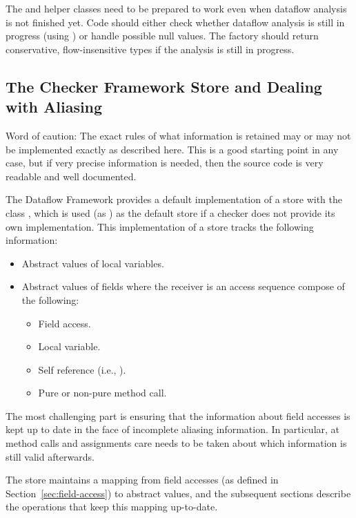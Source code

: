 The  and helper classes need to be prepared to work
even when dataflow analysis is not finished yet. Code should either check
whether dataflow analysis is still in progress (using
) or handle possible null values. The factory should
return conservative, flow-insensitive types if the analysis is still in
progress.


\subsection{The Checker Framework Store and Dealing with Aliasing}

\begin{workinprogress}
    Word of caution: The exact rules of what information is
        retained may or may not be implemented exactly as described
        here.  This is a good starting point in any case, but if very
        precise information is needed, then the source code is very
        readable and well documented.
\end{workinprogress}

The Dataflow Framework provides a default implementation of a store
with the class , which is used (as
) as the default store if a checker does not provide its
own implementation.  This implementation of a store tracks the
following information:

\begin{itemize}
    \item Abstract values of local variables.
    \item Abstract values of fields where the receiver is an
          access sequence compose of the following:
    \begin{itemize}
    \item Field access.
    \item Local variable.
    \item Self reference (i.e., ).
    \item Pure or non-pure method call.
    \end{itemize}
\end{itemize}

The most challenging part is ensuring that the information about field
accesses is kept up to date in the face of incomplete aliasing
information.  In particular, at method calls and assignments care
needs to be taken about which information is still valid afterwards.

The store maintains a mapping from field accesses (as defined in
Section~\ref{sec:field-access}) to abstract values, and the subsequent
sections describe the operations that keep this mapping up-to-date.

